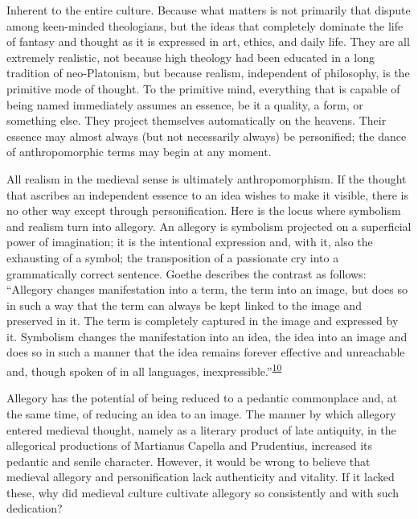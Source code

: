 Inherent to the entire culture. Because what matters is not primarily
that dispute among keen-minded theologians, but the ideas that
completely dominate the life of fantasy and thought as it is expressed
in art, ethics, and daily life. They are all extremely realistic, not
because high theology had been educated in a long tradition of
neo-Platonism, but because realism, independent of philosophy, is the
primitive mode of thought. To the primitive mind, everything that is
capable of being named immediately assumes an
es\protect\hypertarget{16_Chapter_Nine__THE_DECLINE_OF_SYM.xhtmlux5cux23page_238}{}{}sence,
be it a quality, a form, or something else. They project themselves
automatically on the heavens. Their essence may almost always (but not
necessarily always) be personified; the dance of anthropomorphic terms
may begin at any moment.

All realism in the medieval sense is ultimately anthropomorphism. If the
thought that ascribes an independent essence to an idea wishes to make
it visible, there is no other way except through personification. Here
is the locus where symbolism and realism turn into allegory. An allegory
is symbolism projected on a superficial power of imagination; it is the
intentional expression and, with it, also the exhausting of a symbol;
the transposition of a passionate cry into a grammatically correct
sentence. Goethe describes the contrast as follows: ``Allegory changes
manifestation into a term, the term into an image, but does so in such a
way that the term can always be kept linked to the image and preserved
in it. The term is completely captured in the image and expressed by it.
Symbolism changes the manifestation into an idea, the idea into an image
and does so in such a manner that the idea remains forever effective and
unreachable and, though spoken of in all languages,
inexpressible.''\textsuperscript{\protect\hypertarget{16_Chapter_Nine__THE_DECLINE_OF_SYM.xhtmlux5cux23id_773}{\protect\hyperlink{23_NOTES.xhtmlux5cux23id_774}{10}}}

Allegory has the potential of being reduced to a pedantic commonplace
and, at the same time, of reducing an idea to an image. The manner by
which allegory entered medieval thought, namely as a literary product of
late antiquity, in the allegorical productions of Martianus Capella and
Prudentius, increased its pedantic and senile character. However, it
would be wrong to believe that medieval allegory and personification
lack authenticity and vitality. If it lacked these, why did medieval
culture cultivate allegory so consistently and with such dedication?

